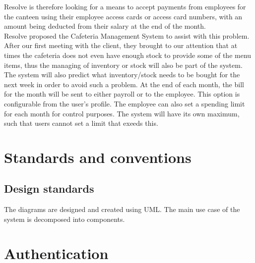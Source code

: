 \documentclass[a4paper,12pt]{article}
\begin{document}
Resolve is therefore looking for a means to accept payments from employees for the canteen using their employee access cards or access card numbers, with an amount being deducted from their salary at the end of the month.\\

Resolve proposed the Cafeteria Management System to assist with this problem.
After our first meeting with the client, they brought to our attention that at times the cafeteria does not even have enough stock to provide some of the menu items, thus the managing of inventory or stock will also be part of the system. The system will also predict what inventory/stock needs to be bought for the next week in order to avoid such a problem. At the end of each month, the bill for the month will be sent to either payroll or to the employee. This option is configurable from the user's profile. The employee can also set a spending limit for each month for control purposes. The system will have its own maximum, such that users cannot set a limit that exeeds this. 


\section{Standards and conventions}

\subsection{Design standards}
 The diagrams are designed and created using UML. The main use case of the system is decomposed into components.

\section{Authentication}
\end{document}
